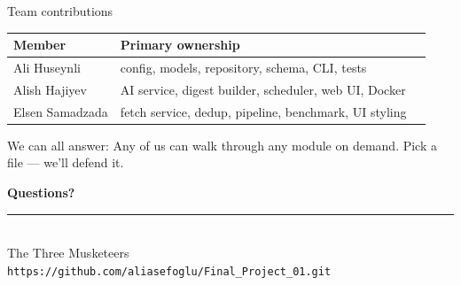 \documentclass[aspectratio=169,11pt]{beamer}
\newcommand{\teamname}{The Three Musketeers}
\newcommand{\memberone}{Ali Huseynli}
\newcommand{\membertwo}{Alish Hajiyev}
\newcommand{\memberthree}{Elsen Samadzada}
\newcommand{\repolink}{https://github.com/aliasefoglu/Final_Project_01.git}
\begin{document}
\begin{frame}{Team contributions}
  \begin{center}\small
  \begin{tabularx}{\linewidth}{lXl}
    \toprule
    \textbf{Member} & \textbf{Primary ownership}\\
    \midrule
    \memberone   & config, models, repository, schema, CLI, tests \\
    \membertwo   & AI service, digest builder, scheduler, web UI, Docker \\
    \memberthree & fetch service, dedup, pipeline, benchmark, UI styling \\
    \bottomrule
  \end{tabularx}
  \end{center}


  \vspace{0.4em}
  \begin{block}{We can all answer:}
    Any of us can walk through any module on demand. Pick a file --- we'll defend it.
  \end{block}

  \vspace{0.4em}
  
\end{frame}

{%
\begin{frame}[plain]
  \begin{center}
    \vspace{1cm}
    {\Huge\bfseries\color{accent} Questions?}\\[1.2em]
    \rule{0.5\textwidth}{0.6pt}\\[1.2em]
    {\large \teamname}\\[0.6em]
    {\normalsize \texttt{\repolink}}\\[1cm]
    
  \end{center}
\end{frame}
}
\end{document}
